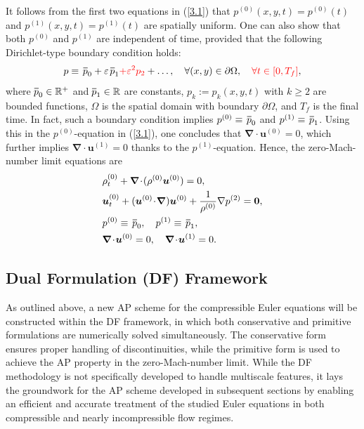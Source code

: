 \documentclass[A4paper,12pt,twoside]{article}
\numberwithin{equation}{section}
\numberwithin{figure}{section}
\numberwithin{table}{section}
\def\bnabla{\bm{\nabla}}
\newcommand{\ve}{\varepsilon}
\newcommand\eref[1]{(\ref{#1})}
\newcommand*\xbar[1]{%
  \hbox{%
    \vbox{%
      \hrule height 0.5pt %
      \kern0.4ex%
      \hbox{%
        \kern-0.05em%
        \ensuremath{#1}%
        \kern-0.00em%
      }%
    }%
  }%
}
\newcommand{\lore}[1]{{\leavevmode\color{red} #1}}
\begin{document}
It follows from the first two equations in \eref{3.1} that $p^{(0)}(x,y,t)=p^{(0)}(t)$ and $p^{(1)}(x,y,t)=p^{(1)}(t)$ are \lore{spatially} uniform.
One can also show that both $p^{(0)}$ and $p^{(1)}$ are independent of time, provided \lore{that} the following Dirichlet-type boundary condition holds:
\begin{equation}
p\equiv\,\xbar p_0+\ve\,\xbar p_1 \lore{+\ve^2 p_2}+\dots ,\quad\forall(x,y)\in\partial\Omega,\quad \lore{\forall t\in [0,T_f]},
\label{3.2}			
\end{equation}
where $\xbar p_0\in \mathbb{R^+}$ and $\xbar p_1\in\mathbb{R}$ are constants, \lore{$p_k:=p_k(x,y,t)$ with $k\geq 2$ are bounded functions}, $\Omega$ is the spatial domain with boundary $\partial\Omega$, \lore{and $T_f$ is the final time}. 
\lore{In fact, such a boundary condition} implies $p^{(0)}\equiv\,\xbar p_0$ and $p^{(1)}\equiv\,\xbar p_1$. Using this in the $p^{(0)}$-equation in
\eref{3.1}, one concludes that $\bnabla\!\cdot\!\bm u^{(0)}=0$, which further implies $\bnabla\!\cdot\!\bm u^{(1)}=0$ thanks to the $p^{(1)}$-equation.
%
Hence, the zero-Mach-number \lore{limit} equations are
\begin{align}
&\rho^{(0)}_t+\bnabla\!\cdot\!(\rho^{(0)}\bm u^{(0)})=0,\label{3.3}\\
&\bm u^{(0)}_t+(\bm u^{(0)}\!\cdot\!\bnabla)\bm u^{(0)}+\frac{1}{\rho^{(0)}}\nabla p^{(2)}=\bm0,\label{3.4}\\
&p^{(0)}\equiv\,\xbar p_0,\quad p^{(1)}\equiv\,\xbar p_1,\label{3.5_p}\\
&\bnabla\!\cdot\!\bm u^{(0)}=0,\quad \bnabla\!\cdot\!\bm u^{(1)}=0.\label{3.5_u}
\end{align}


\subsection{\lore{Dual Formulation (DF) Framework}}\label{sec4a}
As outlined above, a new AP scheme for the compressible Euler equations will be constructed within the DF framework, in which both
conservative and primitive formulations are numerically solved simultaneously. 
\lore{The conservative form ensures proper handling of
discontinuities, %
while the primitive form is used to achieve the AP property in the zero-Mach-number limit.} %
While the DF methodology is not specifically developed to handle multiscale features, it lays the groundwork
for the AP scheme developed in subsequent sections by enabling an efficient and accurate treatment of the studied Euler equations in both
compressible and nearly incompressible flow regimes.
\end{document}
